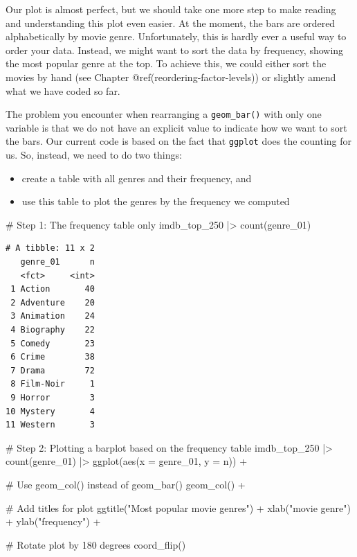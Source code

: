 \documentclass[
  letterpaper,
]{krantz}
\makeatletter
\newenvironment{Shaded}{\begin{snugshade}}{\end{snugshade}}
\newcommand{\AttributeTok}[1]{\textcolor[rgb]{0.40,0.45,0.13}{#1}}
\newcommand{\CommentTok}[1]{\textcolor[rgb]{0.37,0.37,0.37}{#1}}
\newcommand{\FunctionTok}[1]{\textcolor[rgb]{0.28,0.35,0.67}{#1}}
\newcommand{\NormalTok}[1]{\textcolor[rgb]{0.00,0.23,0.31}{#1}}
\newcommand{\SpecialCharTok}[1]{\textcolor[rgb]{0.37,0.37,0.37}{#1}}
\newcommand{\StringTok}[1]{\textcolor[rgb]{0.13,0.47,0.30}{#1}}
\newenvironment{kframe}{%
\medskip{}
\setlength{\fboxsep}{.8em}
 \def\at@end@of@kframe{}%
 \ifinner\ifhmode%
  \def\at@end@of@kframe{\end{minipage}}%
  \begin{minipage}{\columnwidth}%
 \fi\fi%
 \def\FrameCommand##1{\hskip\@totalleftmargin \hskip-\fboxsep
 \colorbox{shadecolor}{##1}\hskip-\fboxsep
     \hskip-\linewidth \hskip-\@totalleftmargin \hskip\columnwidth}%
 \MakeFramed {\advance\hsize-\width
   \@totalleftmargin\z@ \linewidth\hsize
   \@setminipage}}%
 {\par\unskip\endMakeFramed%
 \at@end@of@kframe}
\renewenvironment{Shaded}{\begin{kframe}}{\end{kframe}}
\makeatother
\begin{document}
Our plot is almost perfect, but we should take one more step to make
reading and understanding this plot even easier. At the moment, the bars
are ordered alphabetically by movie genre. Unfortunately, this is hardly
ever a useful way to order your data. Instead, we might want to sort the
data by frequency, showing the most popular genre at the top. To achieve
this, we could either sort the movies by hand (see Chapter
@ref(reordering-factor-levels)) or slightly amend what we have coded so
far.

The problem you encounter when rearranging a \texttt{geom\_bar()} with
only one variable is that we do not have an explicit value to indicate
how we want to sort the bars. Our current code is based on the fact that
\texttt{ggplot} does the counting for us. So, instead, we need to do two
things:

\begin{itemize}
\item
  create a table with all genres and their frequency, and
\item
  use this table to plot the genres by the frequency we computed
\end{itemize}

\begin{Shaded}
\begin{Highlighting}[]
\CommentTok{\# Step 1: The frequency table only}
\NormalTok{imdb\_top\_250 }\SpecialCharTok{|\textgreater{}}
  \FunctionTok{count}\NormalTok{(genre\_01)}
\end{Highlighting}
\end{Shaded}

\begin{verbatim}
# A tibble: 11 x 2
   genre_01      n
   <fct>     <int>
 1 Action       40
 2 Adventure    20
 3 Animation    24
 4 Biography    22
 5 Comedy       23
 6 Crime        38
 7 Drama        72
 8 Film-Noir     1
 9 Horror        3
10 Mystery       4
11 Western       3
\end{verbatim}

\begin{Shaded}
\begin{Highlighting}[]
\CommentTok{\# Step 2: Plotting a barplot based on the frequency table}
\NormalTok{imdb\_top\_250 }\SpecialCharTok{|\textgreater{}}
  \FunctionTok{count}\NormalTok{(genre\_01) }\SpecialCharTok{|\textgreater{}}
  \FunctionTok{ggplot}\NormalTok{(}\FunctionTok{aes}\NormalTok{(}\AttributeTok{x =}\NormalTok{ genre\_01, }\AttributeTok{y =}\NormalTok{ n)) }\SpecialCharTok{+}

  \CommentTok{\# Use geom\_col() instead of geom\_bar()}
  \FunctionTok{geom\_col}\NormalTok{() }\SpecialCharTok{+}
  
  \CommentTok{\# Add titles for plot}
  \FunctionTok{ggtitle}\NormalTok{(}\StringTok{"Most popular movie genres"}\NormalTok{) }\SpecialCharTok{+}
  \FunctionTok{xlab}\NormalTok{(}\StringTok{"movie genre"}\NormalTok{) }\SpecialCharTok{+}
  \FunctionTok{ylab}\NormalTok{(}\StringTok{"frequency"}\NormalTok{) }\SpecialCharTok{+}
  
  \CommentTok{\# Rotate plot by 180 degrees}
  \FunctionTok{coord\_flip}\NormalTok{()}
\end{Highlighting}
\end{Shaded}
\end{document}
